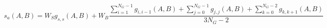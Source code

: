 \begin{equation}
s_a(A,B) = W_S g_{s,s}(A,B) + W_B \frac{\sum_{i=1}^{N_G-1} g_{i,i-1}(A,B) + \sum_{j=0}^{N_G-1} g_{j,j}(A,B) + \sum_{k=0}^{N_G-2} g_{k,k+1}(A,B)}{3N_G-2}
\label{eq:song_distance_ordered_area}
\end{equation}
